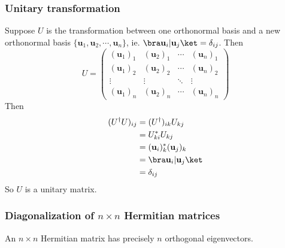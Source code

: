 \documentclass[a4paper]{article}
\begin{document}
      \subsubsection{Unitary transformation}
      Suppose $U$ is the transformation between one orthonormal basis and a new orthonormal basis $\{\mathbf{u}_1, \mathbf{u}_2, \cdots, \mathbf{u}_n\}$, ie. $\bra \mathbf{u}_i| \mathbf{u}_j\ket = \delta_{ij}$. Then
      \[
        U = 
        \begin{pmatrix}
          (\mathbf{u}_1)_1 & (\mathbf{u}_2)_1 & \cdots & (\mathbf{u}_n)_1\\
          (\mathbf{u}_1)_2 & (\mathbf{u}_2)_2 & \cdots & (\mathbf{u}_n)_2\\
          \vdots & \vdots & \ddots & \vdots\\
          (\mathbf{u}_1)_n & (\mathbf{u}_2)_n & \cdots & (\mathbf{u}_n)_n
        \end{pmatrix}
      \]
      Then 
      \begin{align*}
        (U^\dagger U)_{ij} &= (U^\dagger)_{ik}U_{kj}\\
        &= U_{ki}^* U_{kj}\\
        &= (\mathbf{u}_i)^*_k(\mathbf{u}_j)_k\\
        &= \bra \mathbf{u}_i | \mathbf{u}_j \ket\\
        &= \delta_{ij}
      \end{align*}
      So $U$ is a unitary matrix.
      \subsubsection{Diagonalization of \texorpdfstring{$n\times n$}{n x n} Hermitian matrices}
      \begin{thm}
        An $n\times n$ Hermitian matrix has precisely $n$ orthogonal eigenvectors.
      \end{thm}
\end{document}
